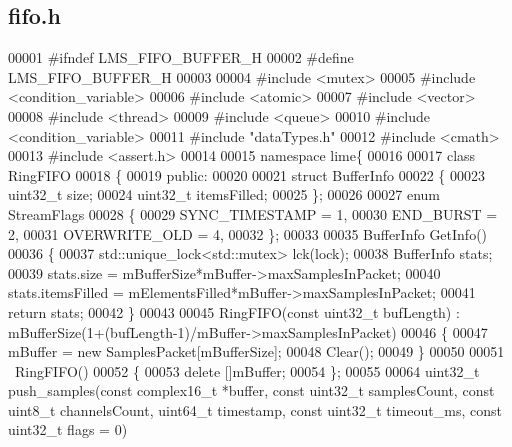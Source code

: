 \subsection{fifo.\+h}
\label{fifo_8h_source}

\begin{DoxyCode}
00001 \textcolor{preprocessor}{#ifndef LMS\_FIFO\_BUFFER\_H}
00002 \textcolor{preprocessor}{#define LMS\_FIFO\_BUFFER\_H}
00003 
00004 \textcolor{preprocessor}{#include <mutex>}
00005 \textcolor{preprocessor}{#include <condition\_variable>}
00006 \textcolor{preprocessor}{#include <atomic>}
00007 \textcolor{preprocessor}{#include <vector>}
00008 \textcolor{preprocessor}{#include <thread>}
00009 \textcolor{preprocessor}{#include <queue>}
00010 \textcolor{preprocessor}{#include <condition\_variable>}
00011 \textcolor{preprocessor}{#include "dataTypes.h"}
00012 \textcolor{preprocessor}{#include <cmath>}
00013 \textcolor{preprocessor}{#include <assert.h>}
00014 
00015 \textcolor{keyword}{namespace }lime\{
00016 
00017 \textcolor{keyword}{class }RingFIFO
00018 \{
00019 \textcolor{keyword}{public}:
00020 
00021     \textcolor{keyword}{struct }BufferInfo
00022     \{
00023         uint32\_t size;
00024         uint32\_t itemsFilled;
00025     \};
00026     
00027     \textcolor{keyword}{enum} StreamFlags
00028     \{
00029         SYNC_TIMESTAMP = 1,
00030         END_BURST = 2,
00031         OVERWRITE_OLD = 4,
00032     \};
00033 
00035     BufferInfo GetInfo()
00036     \{
00037         std::unique\_lock<std::mutex> lck(lock);
00038         BufferInfo stats;
00039         stats.size = mBufferSize*mBuffer->maxSamplesInPacket;
00040         stats.itemsFilled = mElementsFilled*mBuffer->maxSamplesInPacket;
00041         \textcolor{keywordflow}{return} stats;
00042     \}
00043 
00045     RingFIFO(\textcolor{keyword}{const} uint32\_t bufLength) : mBufferSize(1+(bufLength-1)/mBuffer->maxSamplesInPacket)
00046     \{
00047         mBuffer = \textcolor{keyword}{new} SamplesPacket[mBufferSize];
00048         Clear();
00049     \}
00050 
00051     ~RingFIFO()
00052     \{
00053         \textcolor{keyword}{delete} []mBuffer;
00054     \};
00055 
00064     uint32\_t push_samples(\textcolor{keyword}{const} complex16_t *buffer, \textcolor{keyword}{const} uint32\_t samplesCount, \textcolor{keyword}{const} uint8\_t 
      channelsCount, uint64\_t timestamp, \textcolor{keyword}{const} uint32\_t timeout_ms, \textcolor{keyword}{const} uint32\_t flags = 0)

\end{DoxyCode}
